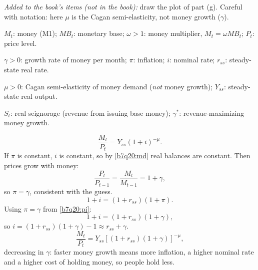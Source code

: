 \noindent\textit{Added to the book's items (not in the book):} draw the plot of part (g). Careful with notation: here $\mu$ is the
Cagan semi-elasticity, not money growth ($\gamma$).
\resolespaco
\begin{sol}
\begin{notacao}
\item $M_t$: money (M1); $MB_t$: monetary base; $\omega>1$: money multiplier, $M_t=\omega MB_t$; $P_t$: price level.
\item $\gamma>0$: growth rate of money per month; $\pi$: inflation; $i$: nominal rate; $r_{ss}$: steady-state real rate.
\item $\mu>0$: Cagan semi-elasticity of money demand (\emph{not} money growth); $Y_{ss}$: steady-state real output.
\item $S_t$: real seignorage (revenue from issuing base money); $\gamma^\ast$: revenue-maximizing money growth.
\end{notacao}
\begin{equation}
\frac{M_t}{P_t}=Y_{ss}(1+i)^{-\mu}. \label{b7q20:md}
\end{equation}
If $\pi$ is constant, $i$ is constant, so by \eqref{b7q20:md} real balances are constant. Then prices grow with money:
\begin{equation}
\frac{P_t}{P_{t-1}}=\frac{M_t}{M_{t-1}}=1+\gamma, \label{b7q20:pi}
\end{equation}
so $\boxed{\pi=\gamma}$, consistent with the guess.
\begin{equation}
1+i=(1+r_{ss})(1+\pi). \label{b7q20:fisher}
\end{equation}
Using $\pi=\gamma$ from \eqref{b7q20:pi}:
\begin{equation}
1+i=(1+r_{ss})(1+\gamma), \label{b7q20:i}
\end{equation}
so $i=(1+r_{ss})(1+\gamma)-1\approx r_{ss}+\gamma$.
\begin{equation}
\frac{M_t}{P_t}=Y_{ss}\left[(1+r_{ss})(1+\gamma)\right]^{-\mu}, \label{b7q20:m}
\end{equation}
decreasing in $\gamma$: faster money growth means more inflation, a higher nominal rate and a higher cost of holding money, so
people hold less.
\begin{align}

\end{align}
\end{sol}
